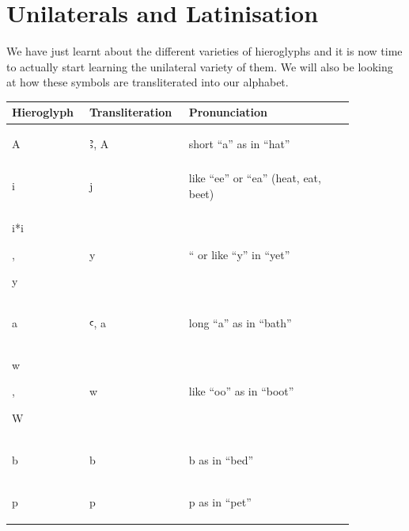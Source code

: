 \documentclass[a5paper,twoside,11pt]{report}
\newcommand{\AHiero}{{\fontspec{DejaVu Sans}Ꜣ}}
\newcommand{\aHiero}{{\fontspec{DejaVu Sans}ꜥ}}
\begin{document}
\chapter*{Unilaterals and Latinisation}

    We have just learnt about the different varieties of hieroglyphs and it is now time to actually start learning the unilateral variety of them. We will also be looking at how these symbols are transliterated into our alphabet.
    
    \begin{center}
      \begin{longtable}{p{0.18\linewidth} | p{0.23\linewidth} | p{0.45\linewidth}}
        Hieroglyph & Transliteration & Pronunciation \\ [0.5ex]
        \hline\hline
        \begin{hieroglyph}A\end{hieroglyph} & \AHiero, A & short “a” as in “hat” \\
        \hline
        \begin{hieroglyph}i\end{hieroglyph} & j & like “ee” or “ea” (heat, eat, beet) \\
        \hline
        \begin{hieroglyph}i*i\end{hieroglyph}, \begin{hieroglyph}y\end{hieroglyph} & y & “
        or like “y” in “yet” \\
        \hline
        \begin{hieroglyph}a\end{hieroglyph} & \aHiero, a & long “a” as in “bath” \\
        \hline
        \begin{hieroglyph}w\end{hieroglyph}, \begin{hieroglyph}W\end{hieroglyph} & w & like “oo” as in “boot” \\
        \hline
        \begin{hieroglyph}b\end{hieroglyph} & b & b as in “bed” \\
        \hline
        \begin{hieroglyph}p\end{hieroglyph} & p & p as in “pet” \\

\end{longtable}
\end{center}
\end{document}
